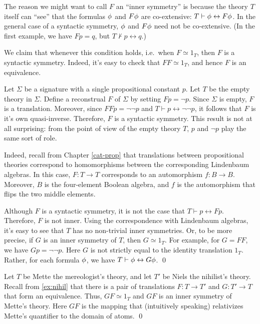 The reason we might want to call $F$ an ``inner symmetry'' is because
the theory $T$ itself can ``see'' that the formulas $\phi$ and $F\phi$
are co-extensive: $T\vdash \phi\leftrightarrow F\phi$.  In the general
case of a syntactic symmetry, $\phi$ and $F\phi$ need not be
co-extensive.  (In the first example, we have $Fp=q$, but
$T\not\vdash p\leftrightarrow q$.)

We claim that whenever this condition holds, i.e.\ when $F\simeq 1_T$,
then $F$ is a syntactic symmetry.  Indeed, it's easy to check that
$FF\simeq 1_T$, and hence $F$ is an equivalence.


\begin{example} Let $\Sigma$ be a signature with a single
  propositional constant $p$.  Let $T$ be the empty theory in
  $\Sigma$.  Define a reconstrual $F$ of $\Sigma$ by setting
  $Fp=\neg p$.  Since $\Sigma$ is empty, $F$ is a translation.
  Moreover, since $FFp=\neg\neg p$ and
  $T\vdash p\leftrightarrow \neg\neg p$, it follows that $F$ is it's
  own quasi-inverse.  Therefore, $F$ is a syntactic symmetry.  This
  result is not at all surprising: from the point of view of the empty
  theory $T$, $p$ and $\neg p$ play the same sort of role.

  Indeed, recall from Chapter \ref{cat-prop} that translations between
  propositional theories correspond to homomorphisms between the
  corresponding Lindenbaum algebras.  In this case, $F:T\to T$
  corresponds to an automorphism $f:B\to B$.  Moreover, $B$ is the
  four-element Boolean algebra, and $f$ is the automorphism that flips
  the two middle elements.

  Although $F$ is a syntactic symmetry, it is not the case that
  $T\vdash p\leftrightarrow Fp$.  Therefore, $F$ is not inner.  Using
  the correspondence with Lindenbaum algebras, it's easy to see that
  $T$ has no non-trivial inner symmetries.  Or, to be more precise, if
  $G$ is an inner symmetry of $T$, then $G\simeq 1_T$.  For example,
  for $G=FF$, we have $Gp=\neg\neg p$.  Here $G$ is not strictly equal
  to the identity translation $1_T$.  Rather, for each formula $\phi$,
  we have $T\vdash \phi\leftrightarrow G\phi$. \hfill \qed \end{example}

\begin{example} Let $T$ be Mette the mereologist's theory, and let
  $T'$ be Niels the nihilist's theory.  Recall from \ref{ex:nihil}
  that there is a pair of translations $F:T\to T'$ and $G:T'\to T$
  that form an equivalence.  Thus, $GF\simeq 1_T$ and $GF$ is an inner
  symmetry of Mette's theory.  Here $GF$ is the mapping that
  (intuitively speaking) relativizes Mette's quantifier to the domain
  of atoms. \hfill \qed \end{example}


